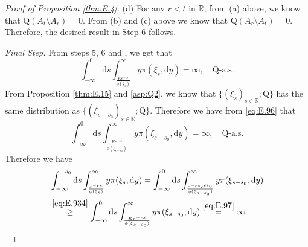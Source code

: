 \documentclass[12pt,a4paper]{amsart}
\numberwithin{equation}{section}
\theoremstyle{plain}
\theoremstyle{definition}
\theoremstyle{remark}
\begin{document}
\begin{proof}[Proof of Proposition \ref{thm:E.4}]
(d) 
	For any $r<t$ in $\mathbb R$, 
	from (a) above,
	we know that $\mathrm Q(A_t\setminus A_r) = 0$.
	From (b) and (c) above 
	we know that $\mathrm Q(A_r\setminus A_t) = 0$.
	Therefore, the desired result in Step 6 follows.

\emph{Final Step.}
From steps 5, 6
	and \cite[Theorem 1.2.4.(i)]{DaPratoZabczyk1996Ergodicity}, we get that
\begin{equation} \label{eq:E.96}
	\int_{-\infty}^{0} \mathrm ds \int_{\frac{K e^{-\epsilon s}}{\phi(\xi_{s})}}^\infty y \pi(\xi_{s},\mathrm dy) = \infty, \quad \mathrm Q\text{-a.s.}
\end{equation}
	From Proposition \ref{thm:E.15} and \eqref{asp:Q2}, we know that $\{(\xi_s)_{s\in \mathbb R}; \mathrm Q\}$ has the same distribution as $\{(\xi_{s-s_0})_{s\in \mathbb R}; \mathrm Q\}$.
	Therefore we have from \eqref{eq:E.96} that
\begin{equation}\label{eq:E.97}
	\int_{-\infty}^{0} \mathrm ds \int_{\frac{K e^{-\epsilon s}}{\phi(\xi_{s-s_0})}}^\infty y \pi(\xi_{s-s_0},\mathrm dy) = \infty, \quad \mathrm Q\text{-a.s.}
\end{equation}
	Therefore we have
\begin{align}
	&\int_{-\infty}^{-s_0} \mathrm ds \int_{\frac{e^{-\epsilon s}}{\phi(\xi_{s})}}^\infty y \pi(\xi_{s},\mathrm dy)
	= \int_{-\infty}^{0} \mathrm ds \int_{\frac{e^{-\epsilon s} e^{\epsilon s_0}}{\phi(\xi_{s-s_0})}}^\infty y \pi(\xi_{s-s_0},\mathrm dy)
	\\&\overset{\eqref{eq:E.934}}\geq \int_{-\infty}^{0} \mathrm ds \int_{\frac{K e^{-\epsilon s}}{\phi(\xi_{s-s_0})}}^\infty y \pi(\xi_{s-s_0},\mathrm dy)
	\overset{\eqref{eq:E.97}}= \infty.
	\qedhere
\end{align}
\end{proof}
\end{document}
